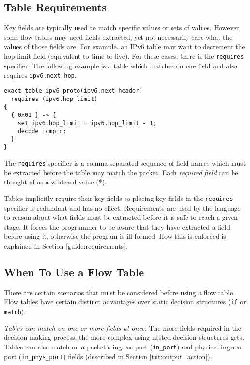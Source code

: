 \subsection{Table Requirements} \label{tut:table_req}

Key fields are typically used to match specific values or sets of values. However, some flow tables may need fields extracted, yet not
necessarily care what the values of those fields are. 
For example, an IPv6 table
may want to decrement the hop-limit field (equivalent to time-to-live).
For these cases, there is the \texttt{requires} specifier.
The following example is a table which matches on one field and also requires
\texttt{ipv6.next\_hop}.

\begin{lstlisting}
exact_table ipv6_proto(ipv6.next_header)
  requires (ipv6.hop_limit) 
{
  { 0x01 } -> {
  	set ipv6.hop_limit = ipv6.hop_limit - 1; 
  	decode icmp_d;
  }
}
\end{lstlisting}

The \texttt{requires} specifier is a comma-separated sequence of field names
which must be extracted before the table may match the packet.
Each \textit{required field} can be thought of as a wildcard value (*).

Tables implicitly require their key fields so placing key fields
in the \texttt{requires} specifier is redundant and has no effect. 
Requirements are used by the language to reason about what
fields must be extracted before it is safe to reach a given stage.
It forces the programmer to be aware that they have extracted
a field before using it, otherwise the program is ill-formed. 
How this is enforced is explained in Section \ref{guide:requirements}.

\subsection{When To Use a Flow Table} \label{tut:why_tables}

There are certain scenarios that must be considered before using a
flow table. Flow tables have certain distinct advantages over
static decision structures (\texttt{if} or \texttt{match}).

\textit{Tables can match on one or more fields at once.} The more fields
required in the decision making process, the more complex using nested decision
structures gets. Tables can also match on a packet's ingress port
(\texttt{in\_port}) and physical ingress port (\texttt{in\_phys\_port}) fields
(described in Section \ref{tut:output_action}).

